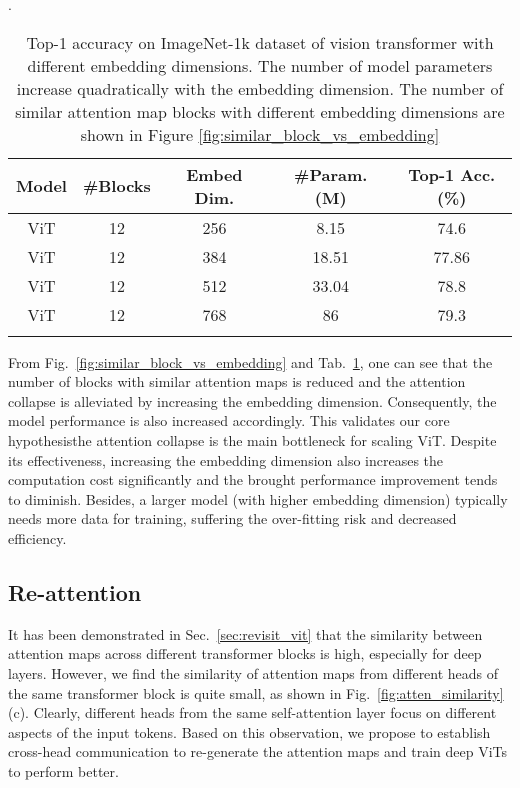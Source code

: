 \documentclass[10pt,twocolumn,letterpaper]{article}
\newcommand{\nameofatten}{Re-attention}
\begin{document}
\begin{table}[t]
\footnotesize
\caption{Top-1 accuracy on ImageNet-1k dataset of vision transformer with different embedding dimensions. The number of model parameters increase quadratically with the embedding dimension. The number of similar attention map blocks with different embedding dimensions are shown in Figure \ref{fig:similar_block_vs_embedding}}. 
\label{tab:increasing_dim}
\centering
\setlength\tabcolsep{1.7mm}
\renewcommand\arraystretch{1.0}
\begin{tabular}{ccccc}
\toprule
\bf Model
&\bf \#Blocks
&\bf Embed Dim.
&\bf \#Param. (M)
&\bf Top-1 Acc.(\%)
\\ \midrule ViT  & 12 & 256 & 8.15 & 74.6 \\
 ViT  & 12 & 384 & 18.51 & 77.86 \\
 ViT  & 12 & 512 & 33.04 & 78.8 \\
 ViT  & 12 & 768 & 86 & 79.3 \\
\bottomrule
\vspace{-5mm}
\end{tabular}
\end{table}



From Fig.~\ref{fig:similar_block_vs_embedding} and Tab.~\ref{tab:increasing_dim}, one can see that the number of blocks with similar attention maps is  reduced and the attention collapse is alleviated by increasing the  embedding dimension. Consequently, 
the model performance is also increased accordingly. This validates our core hypothesis\textemdash the attention collapse is the main bottleneck for scaling ViT. Despite its effectiveness, increasing the embedding dimension also increases the computation cost   significantly and the brought performance  improvement tends to diminish. Besides, a larger model (with higher embedding dimension) typically needs  more data for training, suffering  the   over-fitting risk  and   decreased  efficiency. 





\subsection{\nameofatten{}}
\label{subsec:head_gen}

It has been demonstrated in Sec.~\ref{sec:revisit_vit} that the similarity between
attention maps across different transformer blocks is high, especially for deep
layers.
However, we find  the similarity of attention maps from different heads of
the same transformer block is quite small, as shown in Fig.~\ref{fig:atten_similarity}(c).
Clearly, different heads from the same self-attention layer 
focus on different aspects of the input tokens.
Based on this observation, we propose to establish cross-head communication 
to re-generate the attention maps and train deep ViTs to perform better. 
\end{document}
